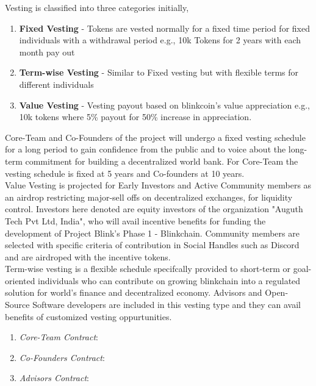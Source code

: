 \documentclass[a4paper,12pt]{article}
\begin{document}
Vesting is classified into three categories initially,
\begin{enumerate}
\item \textbf{Fixed Vesting} - Tokens are vested normally for a fixed time period for fixed individuals with a withdrawal period e.g., 10k Tokens for 2 years with each month pay out
\item \textbf{Term-wise Vesting} - Similar to Fixed vesting but with flexible terms for different individuals
\item \textbf{Value Vesting} - Vesting payout based on blinkcoin's value appreciation e.g., 10k tokens where 5\% payout for 50\% increase in appreciation.
\end{enumerate}

Core-Team and Co-Founders of the project will undergo a fixed vesting schedule for a long period to gain confidence from the public and to voice about the long-term commitment for building a decentralized world bank. For Core-Team the vesting schedule is fixed at 5 years and Co-founders at 10 years.\\

Value Vesting is projected for Early Investors and Active Community members as an airdrop restricting major-sell offs on decentralized exchanges, for liquidity control. Investors here denoted are equity investors of the organization "Auguth Tech Pvt Ltd, India", who will avail incentive benefits for funding the development of Project Blink's Phase 1 - Blinkchain. Community members are selected with specific criteria of contribution in Social Handles such as Discord and are airdroped with the incentive tokens.\\

Term-wise vesting is a flexible schedule specifcally provided to short-term or goal-oriented individuals who can contribute on growing blinkchain into a regulated solution for world's finance and decentralized economy. Advisors and Open-Source Software developers are included in this vesting type and they can avail benefits of customized vesting oppurtunities.\\

\begin{enumerate}
\item \textit{Core-Team Contract}: 
\item \textit{Co-Founders Contract}: 
\item \textit{Advisors Contract}:
\end{enumerate}
\end{document}
